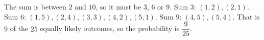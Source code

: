 The sum is between $2$ and $10$, so it must be $3$, $6$ or $9$. Sum $3$: $(1,2),(2,1)$. Sum $6$: $(1,5),(2,4),(3,3),(4,2),(5,1)$. Sum $9$: $(4,5),(5,4)$. That is $9$ of the $25$ equally likely outcomes, so the probability is $\boxed{\dfrac{9}{25}}$.
